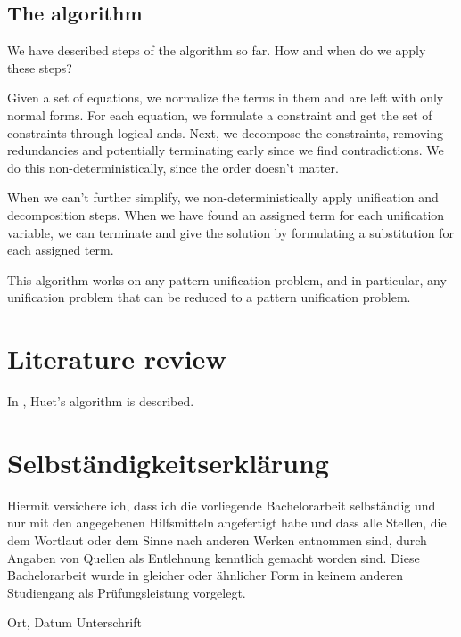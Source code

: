 \documentclass[twoside,12pt,a4paper]{article}
\begin{document}
\subsection{The algorithm}
We have described steps of the algorithm so far. How and when do we apply these steps?

Given a set of equations, we normalize the terms in them and are left with only normal forms. 
For each equation, we formulate a constraint and get the set of constraints through logical ands.
Next, we decompose the constraints, removing redundancies and potentially terminating early since we find contradictions.
We do this non-deterministically, since the order doesn't matter. %

When we can't further simplify, we non-deterministically apply unification and decomposition steps.
When we have found an assigned term for each unification variable, we can terminate and give the solution
by formulating a substitution for each assigned term.

This algorithm works on any pattern unification problem, and in particular, any unification problem that can be reduced to a pattern unification problem. %

\section{Literature review}


\newpage
In \cite{DBLP:books/el/RV01/Dowek01}, Huet's algorithm is described. %








\cleardoublepage

\thispagestyle{empty}
\section*{Selbständigkeitserklärung}

Hiermit versichere ich, dass ich die vorliegende Bachelorarbeit 
selbständig und nur mit den angegebenen Hilfsmitteln angefertigt habe und dass alle Stellen, die dem Wortlaut oder dem 
Sinne nach anderen Werken entnommen sind, durch Angaben von Quellen als 
Entlehnung kenntlich gemacht worden sind. 
Diese Bachelorarbeit wurde in gleicher oder ähnlicher Form in keinem anderen 
Studiengang als Prüfungsleistung vorgelegt. 

\vskip 3cm

Ort, Datum	\hfill Unterschrift \hfill 


\end{document}
